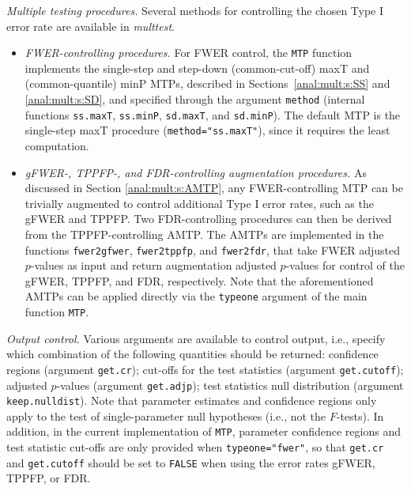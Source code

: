 \documentclass[11pt]{article}
\newcommand{\Rpackage}[1]{\textit{#1}}
\newcommand{\Robject}[1]{\texttt{#1}}
\begin{document}
\begin{description}
\item{\em Multiple testing procedures.} 
Several methods for controlling the chosen Type I error rate are available in \Rpackage{multtest}. 
\begin{itemize}
\item
{\em FWER-controlling procedures.}
For FWER control, the \Robject{MTP} function implements the single-step and step-down (common-cut-off) maxT and (common-quantile) minP MTPs, described in Sections~\ref{anal:mult:s:SS} and \ref{anal:mult:s:SD}, and specified through the argument \Robject{method} (internal functions \Robject{ss.maxT}, \Robject{ss.minP}, \Robject{sd.maxT}, and \Robject{sd.minP}).
The default MTP is the single-step maxT procedure (\Robject{method="ss.maxT"}), since it requires the least computation.
\item 
{\em gFWER-, TPPFP-, and FDR-controlling augmentation procedures.} 
As discussed in Section \ref{anal:mult:s:AMTP}, any FWER-controlling MTP can be trivially augmented to control additional Type I error rates, such as the gFWER and TPPFP.
Two FDR-controlling procedures can then be derived from the TPPFP-controlling AMTP.
The AMTPs are implemented in the functions \Robject{fwer2gfwer}, \Robject{fwer2tppfp}, and \Robject{fwer2fdr}, that take FWER adjusted $p$-values as input and return augmentation adjusted $p$-values for control of the gFWER, TPPFP, and FDR, respectively. 
Note that the aforementioned AMTPs can be applied directly via the \Robject{typeone} argument of the main function \Robject{MTP}.
\end{itemize}

\item{\em Output control.} 
Various arguments are available to control output, i.e., specify which combination of the following quantities should be returned: 
confidence regions (argument \Robject{get.cr}); 
cut-offs for the test statistics (argument \Robject{get.cutoff}); 
adjusted $p$-values (argument \Robject{get.adjp}); 
test statistics null distribution  (argument \Robject{keep.nulldist}). 
Note that parameter estimates and confidence regions only apply to the test of single-parameter null hypotheses (i.e., not the $F$-tests). 
In addition, in the current implementation of \Robject{MTP}, parameter confidence regions and test statistic cut-offs are only provided when \texttt{typeone="fwer"}, so that \Robject{get.cr} and \Robject{get.cutoff} should be set to \Robject{FALSE} when using the error rates gFWER, TPPFP, or FDR.


\end{description}
\end{document}
